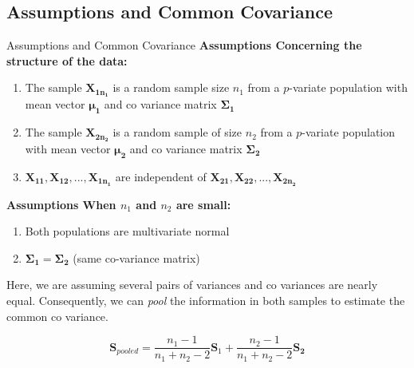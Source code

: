 \documentclass[8pt]{beamer}
\begin{document}
\subsection{Assumptions and Common Covariance}
    \begin{frame}{Assumptions and Common Covariance}
    \textbf{Assumptions Concerning the structure of the data:}
        \begin{enumerate}
            \item The sample $\mathbf{X_{1n_{1}}}$ is a random sample size $n_{1}$ from a $p$-variate population with mean vector $\mathbf{\mu_{1}}$ and co variance matrix $\mathbf{\Sigma_{1}}$
            \item The sample $\mathbf{X_{2n_{2}}}$ is a random sample of size $n_{2}$ from a $p$-variate population with mean vector $\mathbf{\mu_{2}}$ and co variance matrix $\mathbf{\Sigma_{2}}$
            \item $\mathbf{X_{11},X_{12},...,X_{1n_{1}}}$ are independent of $\mathbf{X_{21}, X_{22},...,X_{2n_{2}}}$
        \end{enumerate}
    \textbf{Assumptions When $n_{1}$ and $n_{2}$ are small:}
        \begin{enumerate}
            \item Both populations are multivariate normal
            \item $\mathbf{\Sigma_{1} = \Sigma_{2}}$ (same co-variance matrix)
        \end{enumerate}

        Here, we are assuming several pairs of variances and co variances are nearly equal. Consequently, we can \textit{pool} the information in both samples to estimate the common co variance. 
        
        \begin{equation}
            \mathbf{S}_{pooled} = \frac{n_{1} - 1}{n_{1} + n_{2} - 2}\mathbf{S}_{1} + \frac{n_{2} - 1}{n_{1} + n_{2} - 2}\mathbf{S_{2}}
        \end{equation}
    \end{frame}
    
\end{document}
